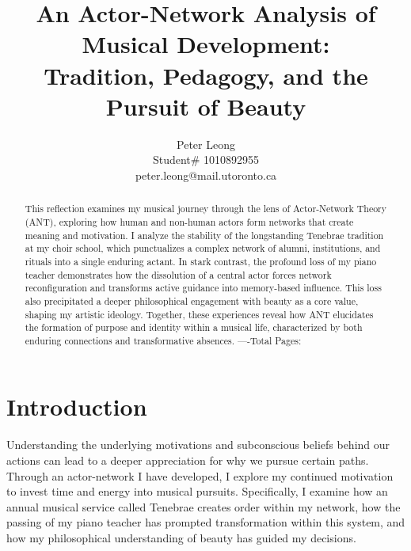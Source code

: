 \documentclass{article} %
\title{An Actor-Network Analysis of Musical Development:\\
Tradition, Pedagogy, and the Pursuit of Beauty}
\author{Peter Leong \\
Student\# 1010892955 \\
peter.leong@mail.utoronto.ca \\
\AND
}
\begin{document}
\vspace{-4ex}

\maketitle

\vspace{-12ex}

\begin{abstract}
This reflection examines my musical journey through the lens of Actor-Network Theory (ANT), exploring how human and non-human actors form networks that create meaning and motivation. 
I analyze the stability of the longstanding Tenebrae tradition at my choir school, which punctualizes a complex network of alumni, institutions, and rituals into a single enduring actant. 
In stark contrast, the profound loss of my piano teacher demonstrates how the dissolution of a central actor forces network reconfiguration and transforms active guidance into memory-based influence. 
This loss also precipitated a deeper philosophical engagement with beauty as a core value, shaping my artistic ideology. Together, these experiences reveal how ANT elucidates the formation of purpose and identity within a musical life, characterized by both enduring connections and transformative absences.
----Total Pages: \pageref{last_page}
\end{abstract}

\vspace{-2ex}


\section{Introduction}

Understanding the underlying motivations and subconscious beliefs behind our actions can lead to a deeper appreciation for why we pursue certain paths. 
Through an actor-network I have developed, I explore my continued motivation to invest time and energy into musical pursuits. 
Specifically, I examine how an annual musical service called Tenebrae creates order within my network, how the passing of my piano teacher has prompted transformation within this system, and how my philosophical understanding of beauty has guided my decisions.
\end{document}
